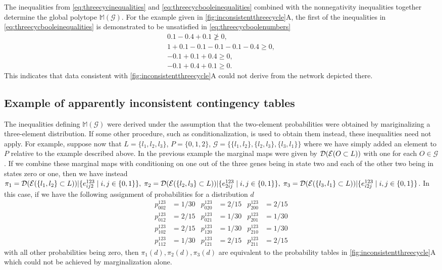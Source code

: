 The inequalities from \ref{eq:threecycinequalities} and \ref{eq:threecycbooleinequalities} combined with the nonnegativity inequalities together determine the global polytope $\mathbb{M}(\mathcal{G})$. For the example given in \ref{fig:inconsistentthreecycle}A, the first of the inequalities in \ref{eq:threecycbooleinequalities} is demonstrated to be unsatisfied in \ref{eq:threecycboolenumbers}
\begin{equation}
\begin{aligned}\label{eq:threecycboolenumbers}
0.1 - 0.4 + 0.1 \not\geq 0, \\
1 + 0.1 - 0.1 - 0.1 - 0.1 - 0.4 \geq 0, \\
-0.1 + 0.1 + 0.4 \geq 0, \\
-0.1 + 0.4 + 0.1 \geq 0.
\end{aligned}
\end{equation}
This indicates that data consistent with \ref{fig:inconsistentthreecycle}A could not derive from the network depicted there.
\subsection{Example of apparently inconsistent contingency tables}\label{sec:apparentinconsistency}
The inequalities defining $\mathbb{M}(\mathcal{G})$ were derived under the assumption that the two-element probabilities were obtained by mariginalizing a three-element distribution.  If some other procedure, such as conditionalization, is used to obtain them instead, these inequalities need not apply. For example, suppose now that $L = \{l_1,l_2,l_3 \}$, $P = \{0,1,2\}$, $\mathcal{G} = \{\{l_1,l_2\},\{l_2,l_3\},\{l_3,l_1\}\}$ where we have simply added an element to $P$ relative to the example described above. In the previous example the marginal maps were given by $\mathcal{D} (\mathcal{E} (O \subset L))$ with one for each $O \in \mathcal{G}$. If we combine these marginal maps with conditioning on one out of the three genes being in state two and each of the other two being in states zero or one, then we have instead $\pi_1 = \mathcal{D} (\mathcal{E} (\{l_1,l_2\} \subset L))|\{ e^{123}_{ij2} \mid i,j \in \{ 0,1 \} \},\; \pi_2 = \mathcal{D} (\mathcal{E} (\{l_2,l_3\} \subset L))|\{ e^{123}_{2ij} \mid i,j \in \{ 0,1 \} \},\; \pi_3 = \mathcal{D} (\mathcal{E} (\{l_3,l_1\} \subset L))|\{ e^{123}_{i2j} \mid i,j \in \{ 0,1 \} \}$. In this case, if we have the following assignment of probabilities for a distribution $d$
\begin{equation}\label{eq:condprobs}
\begin{aligned}
p^{123}_{002} &= 1/30 & p^{123}_{020} &= 2/15 & p^{123}_{200} &= 2/15\\
p^{123}_{012} &= 2/15 & p^{123}_{021} &= 1/30 & p^{123}_{201} &= 1/30\\
p^{123}_{102} &= 2/15 & p^{123}_{120} &= 1/30 & p^{123}_{210} &= 1/30\\
p^{123}_{112} &= 1/30 & p^{123}_{121} &= 2/15 & p^{123}_{211} &= 2/15
\end{aligned}
\end{equation}
with all other probabilities being zero, then $\pi_1(d), \pi_2(d), \pi_3(d)$ are equivalent to the probability tables in \ref{fig:inconsistentthreecycle}A which could not be achieved by marginalization alone.

